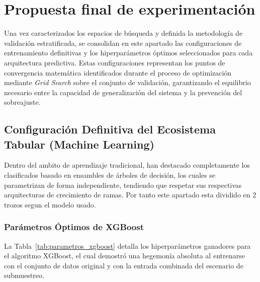 \documentclass[12pt,a4paper,onecolumn,oneside]{report}
\begin{document}
\section{Propuesta final de experimentación}

Una vez caracterizados los espacios de búsqueda y definida la metodología de validación estratificada, se consolidan en este apartado las configuraciones de entrenamiento definitivas y los hiperparámetros óptimos seleccionados para cada arquitectura predictiva. Estas configuraciones representan los puntos de convergencia matemática identificados durante el proceso de optimización mediante \textit{Grid Search} sobre el conjunto de validación, garantizando el equilibrio necesario entre la capacidad de generalización del sistema y la prevención del sobreajuste.

\subsection{Configuración Definitiva del Ecosistema Tabular (Machine Learning)}

Dentro del ambito de aprendizaje tradicional, han destacado completamente los clasificados basado en ensambles de árboles de decisión, los cuales se parametrizan de forma independiente, tendiendo que respetar sus respectivas arquitecturas de crecimiento de ramas. Por tanto este apartado esta dividido en 2 trozos segun el modelo usado.

\subsubsection{Parámetros Óptimos de XGBoost}
La Tabla~\ref{tab:parametros_xgboost} detalla los hiperparámetros ganadores para el algoritmo XGBoost, el cual demostró una hegemonía absoluta al entrenarse con el conjunto de datos original y con la entrada combinada del escenario de submuestreo.
\end{document}
